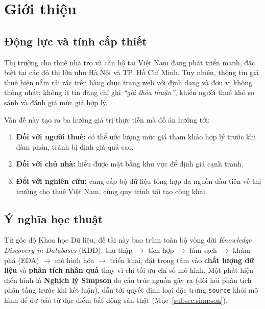 \section{Giới thiệu}
\label{sec:intro}

\subsection{Động lực và tính cấp thiết}

Thị trường cho thuê nhà trọ và căn hộ tại Việt Nam đang phát triển mạnh,
đặc biệt tại các đô thị lớn như Hà Nội và TP. Hồ Chí Minh.
Tuy nhiên, thông tin giá thuê hiện nằm rải rác trên hàng chục trang web với định dạng
và đơn vị không thống nhất; không ít tin đăng chỉ ghi \textit{``giá thỏa thuận''},
khiến người thuê khó so sánh và đánh giá mức giá hợp lý.

Vấn đề này tạo ra ba hướng giá trị thực tiễn mà đồ án hướng tới:
\begin{enumerate}[leftmargin=*, itemsep=3pt]
  \item \textbf{Đối với người thuê:} có thể ước lượng mức giá tham khảo hợp lý
        trước khi đàm phán, tránh bị định giá quá cao.
  \item \textbf{Đối với chủ nhà:} hiểu được mặt bằng khu vực để định giá cạnh tranh.
  \item \textbf{Đối với nghiên cứu:} cung cấp bộ dữ liệu tổng hợp đa nguồn đầu tiên
        về thị trường cho thuê Việt Nam, cùng quy trình tái tạo công khai.
\end{enumerate}

\subsection{Ý nghĩa học thuật}

Từ góc độ Khoa học Dữ liệu, đề tài này bao trùm toàn bộ vòng đời
\textit{Knowledge Discovery in Databases} (KDD): thu thập $\to$ tích hợp $\to$ làm sạch
$\to$ khám phá (EDA) $\to$ mô hình hóa $\to$ triển khai, đặt trọng tâm vào
\textbf{chất lượng dữ liệu} và \textbf{phân tích nhân quả} thay vì chỉ tối ưu chỉ số mô hình.
Một phát hiện điển hình là \textbf{Nghịch lý Simpson} do cấu trúc nguồn gây ra
(đòi hỏi phân tích phân tầng trước khi kết luận), dẫn tới quyết định loại đặc trưng
\texttt{source} khỏi mô hình để dự báo từ đặc điểm bất động sản thật
(Mục~\ref{subsec:simpson}).

